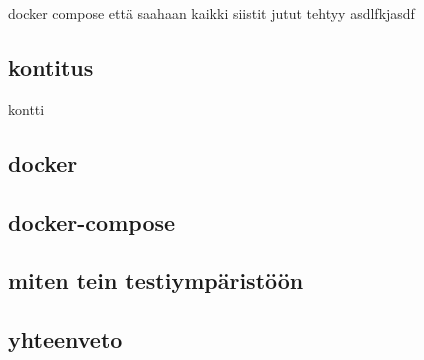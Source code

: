 


docker compose että saahaan kaikki siistit jutut tehtyy
asdlfkjasdf



\subsection*{kontitus}
kontti

\subsection*{docker}
\subsection*{docker-compose}
\subsection*{miten tein testiympäristöön}
\subsection*{yhteenveto}


